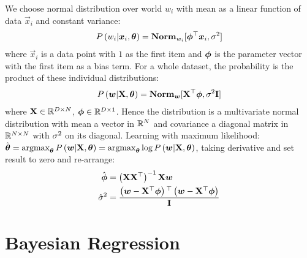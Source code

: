 We choose normal distribution over world $w_i$ with mean as a linear function of data $\vec{x}_i$ and constant variance:
\begin{align*}
	P\left(w_i|\boldsymbol{x}_i,\boldsymbol{\theta}\right)=\mathbf{Norm}_{w_i}[\boldsymbol{\phi}{}^\top\boldsymbol{x}_i,\sigma^2]
\end{align*}
where $\vec{x}_i$ is a data point with $1$ as the first item and $\boldsymbol{\phi}$ is the parameter vector with the first item as a bias term. For a whole dataset, the probability is the product of these individual distributions:
\begin{align*}
	P\left(\boldsymbol{w}|\mathbf{X},\boldsymbol{\theta}\right)=\mathbf{Norm}_{\boldsymbol{w}}[\mathbf{X}{}^\top\boldsymbol{\phi},\sigma^2\mathbf{I}]
\end{align*}
where $\mathbf{X}\in\mathbb{R}^{D\times N}$, $\boldsymbol{\phi}\in\mathbb{R}^{D\times1}$. Hence the distribution is a multivariate normal distribution with mean a vector in $\mathbb{R}^N$ and covariance a diagonal matrix in $\mathbb{R}^{N\times N}$ with $\sigma^2$ on its diagonal. Learning with maximum likelihood: $\hat{\vec{\th}}=\argmax_{\vec{\th}}\P{\vec{w}|\mat{X},\vec{\th}}=\argmax_{\vec{\th}}\log\P{\vec{w}|\mat{X},\vec{\th}}$, taking derivative and set result to zero and re-arrange:
\begin{align*}
	\hat{\boldsymbol{\phi}}&=\left(\mathbf{X}\mathbf{X}{}^\top\right)^{-1}\mathbf{X}\boldsymbol{w} \\
	\hat{\sigma}^2&=\frac{\left(\boldsymbol{w}-\mathbf{X}{}^\top\boldsymbol{\phi}\right){}^\top\left(\boldsymbol{w}-\mathbf{X}{}^\top\boldsymbol{\phi}\right)}{\mathbf{I}}
\end{align*}



\section{Bayesian Regression}
\label{section6.3}

